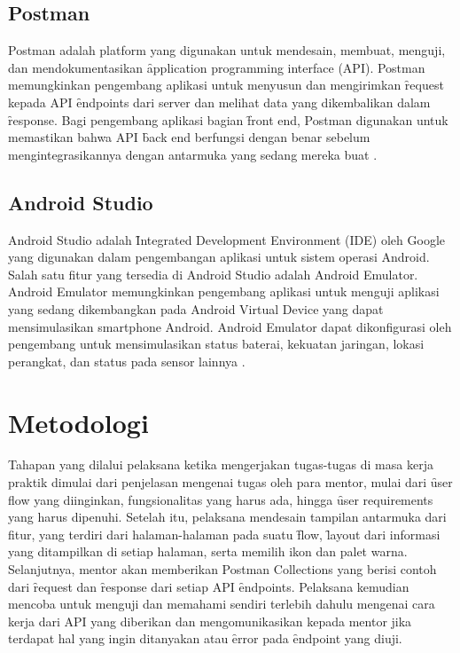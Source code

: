 \subsection{Postman}
\label{sec:postman}
Postman adalah platform yang digunakan untuk mendesain, membuat, menguji, dan
mendokumentasikan \f{application programming interface} (API). Postman
memungkinkan pengembang aplikasi untuk menyusun dan mengirimkan \f{request}
kepada API \f{endpoints} dari server dan melihat data yang dikembalikan dalam
\f{response}. Bagi pengembang aplikasi bagian \f{front end}, Postman digunakan
untuk memastikan bahwa API \f{back end} berfungsi dengan benar sebelum
mengintegrasikannya dengan antarmuka yang sedang mereka buat \citep{postman:blog}.

\subsection{Android Studio}
\label{sec:androidStudio}
Android Studio adalah \f{Integrated Development Environment} (IDE) oleh Google
yang digunakan dalam pengembangan aplikasi untuk sistem operasi Android. Salah
satu fitur yang tersedia di Android Studio adalah Android Emulator. Android
Emulator memungkinkan pengembang aplikasi untuk menguji aplikasi yang sedang
dikembangkan pada Android Virtual Device yang dapat mensimulasikan smartphone
Android. Android Emulator dapat dikonfigurasi oleh pengembang untuk
mensimulasikan status baterai, kekuatan jaringan, lokasi perangkat, dan status
pada sensor lainnya \citep{android:studio}.



\section{Metodologi}
\label{sec:metodologi}
Tahapan yang dilalui pelaksana ketika mengerjakan tugas-tugas di masa kerja
praktik dimulai dari penjelasan mengenai tugas oleh para mentor, mulai dari
\f{user flow} yang diinginkan, fungsionalitas yang harus ada, hingga
\f{user requirements} yang harus dipenuhi. Setelah itu, pelaksana mendesain
tampilan antarmuka dari fitur, yang terdiri dari halaman-halaman pada suatu
\f{flow}, \f{layout} dari informasi yang ditampilkan di setiap halaman, serta
memilih ikon dan palet warna. Selanjutnya, mentor akan memberikan Postman
Collections yang berisi contoh dari \f{request} dan \f{response} dari setiap
API \f{endpoints}. Pelaksana kemudian mencoba untuk menguji dan memahami sendiri
terlebih dahulu mengenai cara kerja dari API yang diberikan dan mengomunikasikan
kepada mentor jika terdapat hal yang ingin ditanyakan atau \f{error} pada
\f{endpoint} yang diuji.

